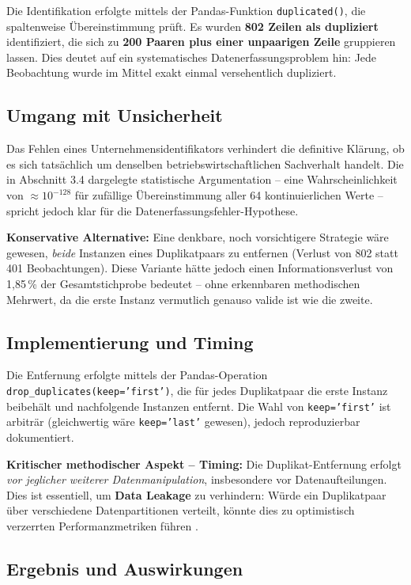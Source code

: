 Die Identifikation erfolgte mittels der Pandas-Funktion \texttt{duplicated()}, die spaltenweise Übereinstimmung prüft. Es wurden \textbf{802 Zeilen als dupliziert} identifiziert, die sich zu \textbf{200 Paaren plus einer unpaarigen Zeile} gruppieren lassen. Dies deutet auf ein systematisches Datenerfassungsproblem hin: Jede Beobachtung wurde im Mittel exakt einmal versehentlich dupliziert.

\subsection{Umgang mit Unsicherheit}

Das Fehlen eines Unternehmensidentifikators verhindert die definitive Klärung, ob es sich tatsächlich um denselben betriebswirtschaftlichen Sachverhalt handelt. Die in Abschnitt 3.4 dargelegte statistische Argumentation – eine Wahrscheinlichkeit von $\approx 10^{-128}$ für zufällige Übereinstimmung aller 64 kontinuierlichen Werte – spricht jedoch klar für die Datenerfassungsfehler-Hypothese.

\textbf{Konservative Alternative:} Eine denkbare, noch vorsichtigere Strategie wäre gewesen, \textit{beide} Instanzen eines Duplikatpaars zu entfernen (Verlust von 802 statt 401 Beobachtungen). Diese Variante hätte jedoch einen Informationsverlust von 1,85\,\% der Gesamtstichprobe bedeutet – ohne erkennbaren methodischen Mehrwert, da die erste Instanz vermutlich genauso valide ist wie die zweite.

\subsection{Implementierung und Timing}

Die Entfernung erfolgte mittels der Pandas-Operation \texttt{drop\_duplicates(keep='first')}, die für jedes Duplikatpaar die erste Instanz beibehält und nachfolgende Instanzen entfernt. Die Wahl von \texttt{keep='first'} ist arbiträr (gleichwertig wäre \texttt{keep='last'} gewesen), jedoch reproduzierbar dokumentiert.

\textbf{Kritischer methodischer Aspekt – Timing:} Die Duplikat-Entfernung erfolgt \textit{vor jeglicher weiterer Datenmanipulation}, insbesondere vor Datenaufteilungen. Dies ist essentiell, um \textbf{Data Leakage} zu verhindern: Würde ein Duplikatpaar über verschiedene Datenpartitionen verteilt, könnte dies zu optimistisch verzerrten Performanzmetriken führen \parencite{goodfellow2016deep}.

\subsection{Ergebnis und Auswirkungen}

